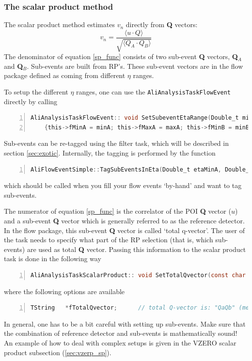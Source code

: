 \documentclass[a4paper]{book}
\numberwithin{equation}{subsection}
\begin{document}
\subsubsection{The scalar product method}
The scalar product method estimates $v_n$ directly from \textbf{Q} vectors:
\begin{equation}\label{sp_func}
v_n = \frac{\langle u \cdotp Q \rangle }{\sqrt{\langle Q_A \cdotp Q_B \rangle}}
\end{equation}
The denominator of equation \ref{sp_func} consists of two sub-event \textbf{Q} vectors, \textbf{Q}$_{A}$ and \textbf{Q}$_{B}$. Sub-events are built from RP's. These sub-event vectors are in the flow package defined as coming from different $\eta$ ranges. 

To setup the different $\eta$ ranges, one can use the \texttt{AliAnalysisTaskFlowEvent} directly by calling
\begin{lstlisting}[language=C, numbers=left]
AliAnalysisTaskFlowEvent:: void SetSubeventEtaRange(Double_t minA, Double_t maxA, Double_t minB, Double_t maxB)
    {this->fMinA = minA; this->fMaxA = maxA; this->fMinB = minB; this->fMaxB = maxB; }\end{lstlisting}
Sub-events can be re-tagged using the filter task, which will be described in section \ref{sec:exotic}. 
Internally, the tagging is performed by the function
\begin{lstlisting}[language=C, numbers=left]
AliFlowEventSimple::TagSubEventsInEta(Double_t etaMinA, Double_t etaMaxA, Double_t etaMinB, Double_t etaMaxB);\end{lstlisting}
which should be called when you fill your flow events `by-hand' and want to tag sub-events. 


The numerator of equation \ref{sp_func} is the correlator of the POI \textbf{Q} vector ($u$) and a sub-event \textbf{Q} vector which is generally referred to as the reference detector. In the flow package, this sub-event \textbf{Q} vector is called `total q-vector'. The user of the task needs to specify what part of the RP selection (that is, which sub-events) are used as total \textbf{Q} vector. Passing this information to the scalar product task is done in the following way
\begin{lstlisting}[language=C, numbers=left]
AliAnalysisTaskScalarProduct:: void SetTotalQvector(const char *tqv) {*this->fTotalQvector = tqv;}; \end{lstlisting}
where the following options are available
\begin{lstlisting}[language=C, numbers=left]
  TString   *fTotalQvector;      // total Q-vector is: "QaQb" (means Qa+Qb), "Qa"  or "Qb" \end{lstlisting}
In general, one has to be a bit careful with setting up sub-events. Make sure that the combination of reference detector and sub-events is mathematically sound! An example of how to deal with complex setups is given in the VZERO scalar product subsection (\ref{sec:vzerp_sp}).
\end{document}
